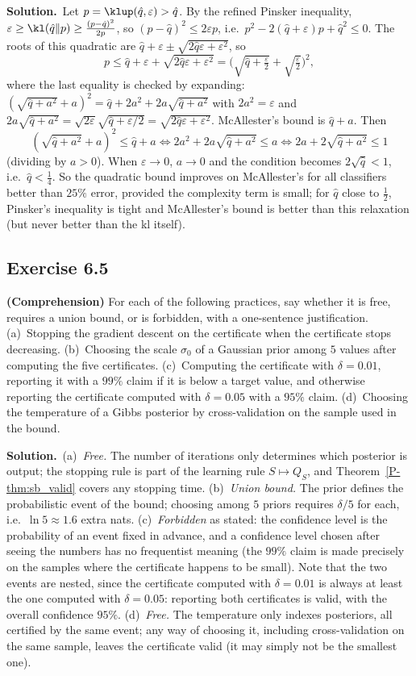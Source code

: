 \documentclass[11pt]{article}
\newcommand{\statement}[1]{\begin{tcolorbox}[enhanced,breakable,colback=black!3,colframe=black!25,boxrule=0.4pt,sharp corners,fontupper=\itshape\small]#1\end{tcolorbox}}
\newcommand{\exo}[1]{\Needspace{6\baselineskip}\subsection*{Exercise #1}\addcontentsline{toc}{subsection}{Exercise #1}}
\newcommand{\sol}{\noindent\textbf{Solution.}\ }
\begin{document}
\sol Let $p=\klup(\hat q,\varepsilon)>\hat q$. By the refined Pinsker inequality, $\varepsilon\geq\kl(\hat q\|p)\geq\frac{(p-\hat q)^2}{2p}$, so
$(p-\hat q)^2\leq2\varepsilon p$, i.e.\ $p^2-2(\hat q+\varepsilon)p+\hat q^2\leq0$. The roots of this quadratic are
$\hat q+\varepsilon\pm\sqrt{2\hat q\varepsilon+\varepsilon^2}$, so
\[
p\leq\hat q+\varepsilon+\sqrt{2\hat q\varepsilon+\varepsilon^2}=\Big(\sqrt{\hat q+\tfrac\varepsilon2}+\sqrt{\tfrac\varepsilon2}\Big)^2,
\]
where the last equality is checked by expanding: $(\sqrt{\hat q+a^2}+a)^2=\hat q+2a^2+2a\sqrt{\hat q+a^2}$ with $2a^2=\varepsilon$ and
$2a\sqrt{\hat q+a^2}=\sqrt{2\varepsilon}\sqrt{\hat q+\varepsilon/2}=\sqrt{2\hat q\varepsilon+\varepsilon^2}$. McAllester's bound is $\hat q+a$. Then
\[
(\sqrt{\hat q+a^2}+a)^2\leq\hat q+a\iff2a^2+2a\sqrt{\hat q+a^2}\leq a\iff2a+2\sqrt{\hat q+a^2}\leq1
\]
(dividing by $a>0$). When $\varepsilon\to0$, $a\to0$ and the condition becomes $2\sqrt{\hat q}<1$, i.e.\ $\hat q<\frac14$. So the quadratic
bound improves on McAllester's for all classifiers better than $25\%$ error, provided the complexity term is small; for
$\hat q$ close to $\frac12$, Pinsker's inequality is tight and McAllester's bound is better than this relaxation (but never better
than the kl itself).

\exo{6.5}
\statement{\textbf{(Comprehension)} For each of the following practices, say whether it is free, requires a union bound, or is
forbidden, with a one-sentence justification. (a)~Stopping the gradient descent on the certificate when the certificate stops
decreasing. (b)~Choosing the scale $\sigma_0$ of a Gaussian prior among $5$ values after computing the five certificates.
(c)~Computing the certificate with $\delta=0.01$, reporting it with a $99\%$ claim if it is below a target value, and otherwise reporting the certificate computed with $\delta=0.05$ with a $95\%$ claim.
(d)~Choosing the temperature of a Gibbs posterior by cross-validation on the sample used in the bound.}

\sol (a)~\emph{Free.} The number of iterations only determines which posterior is output; the stopping rule is part of the
learning rule $S\mapsto Q_S$, and Theorem~\ref{P-thm:sb_valid} covers any stopping time.
(b)~\emph{Union bound.} The prior defines the probabilistic event of the bound; choosing among $5$ priors requires $\delta/5$ for
each, i.e.\ $\ln5\approx1.6$ extra nats.
(c)~\emph{Forbidden} as stated: the confidence level is the probability of an event fixed in advance, and a confidence level chosen after seeing the numbers has no frequentist meaning (the $99\%$ claim is made precisely on the samples where the certificate happens to be small). Note that the two events are nested, since the certificate computed with $\delta=0.01$ is always at least the one computed with $\delta=0.05$: reporting both certificates is valid, with the overall confidence $95\%$.
(d)~\emph{Free.} The temperature only indexes posteriors, all certified by the same event; any way of choosing it, including
cross-validation on the same sample, leaves the certificate valid (it may simply not be the smallest one).
\end{document}

